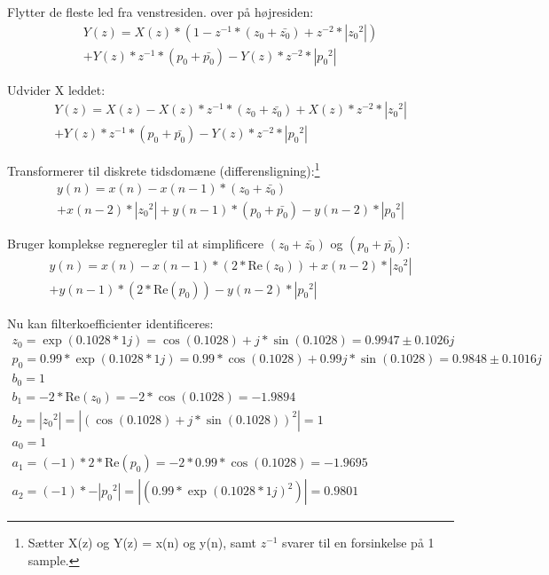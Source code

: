 \documentclass[a4paper,onecolumn,oneside]{report}
\begin{document}
Flytter de fleste led fra venstresiden. over på højresiden:
\begin{equation}
    \begin{split}
    Y(z) = X(z) * (1 - z^{-1}*(z_0+\bar{z_0}) + z^{-2}*|{z_0}^2|) \\
    + Y(z)* z^{-1}*(p_0 +\bar{p_0}) - Y(z)*z^{-2}*|{p_0}^2|
    \end{split}
\end{equation}

Udvider X leddet:
\begin{equation}
    \begin{split}
    Y(z) = X(z) - X(z) *z^{-1}*(z_0+\bar{z_0}) + X(z) * z^{-2}*|{z_0}^2|\\ + Y(z)* z^{-1}*(p_0 +\bar{p_0}) - Y(z)*z^{-2}*|{p_0}^2|
    \end{split}
\end{equation}

Transformerer til diskrete tidsdomæne (differensligning):\footnote{Sætter X(z) og Y(z) = x(n) og y(n), samt $z^{-1}$ svarer til en forsinkelse på 1 sample.}
\begin{equation}
    \begin{split}
    y(n) = x(n) - x(n-1) *(z_0+\bar{z_0}) \\
    + x(n-2)*|{z_0}^2| + y(n-1)*(p_0 +\bar{p_0}) - y(n-2)*|{p_0}^2|
    \end{split}
\end{equation}


Bruger komplekse regneregler til at simplificere $(z_0 +\bar{z_0})$ og $(p_0 +\bar{p_0})$:
\begin{equation}
    \begin{split}
    y(n) = x(n) - x(n-1) *(2*\textrm{Re}(z_0)) + x(n-2)*|{z_0}^2| \\
     + y(n-1)*(2*\textrm{Re}(p_0)) - y(n-2)*|{p_0}^2|
    \end{split}
\end{equation}

Nu kan filterkoefficienter identificeres:
\begin{equation}
    \begin{split}
        z_0  = \exp(0.1028*1j) = \cos(0.1028) + j*\sin(0.1028) = 0.9947 \pm 0.1026j \\
        p_0 = 0.99*\exp(0.1028*1j) = 0.99*\cos(0.1028) + 0.99j*\sin(0.1028) = 0.9848 \pm 0.1016j\\
        b_0 = 1\\
        b_1 = -2*\textrm{Re}(z_0) = -2*\cos(0.1028) = -1.9894\\
        b_2 = |{z_0}^2| = |(\cos(0.1028)+j*\sin(0.1028))^2| = 1 \\
        a_0 = 1\\
        a_1 = (-1)*2*\textrm{Re}(p_0) = -2*0.99*\cos(0.1028) = -1.9695\\
        a_2 = (-1)* -|{p_0}^2| = |(0.99*\exp(0.1028*1j)^2)| = 0.9801
    \end{split}
    \label{eq:opgave2_f:done}
\end{equation}
\end{document}
